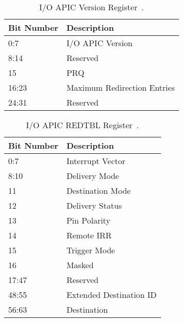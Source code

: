 \begin{table}[H]
  \centering
  \begin{tabularx}{1.0\textwidth}{| X | X |}
    \hline
    \textbf{Bit Number} & \textbf{Description}        \\ \hline\hline
    0:7                 & I/O APIC Version            \\ \hline
    8:14                & Reserved                    \\ \hline
    15                  & PRQ                         \\ \hline
    16:23               & Maximum Redirection Entries \\ \hline
    24:31               & Reserved                    \\ \hline
  \end{tabularx}
  \caption{I/O APIC Version Register~\cite[sec.~9.5.7]{ich5}.}
  \label{tab:ioapicregsver}
\end{table}

\begin{table}[H]
  \centering
  \begin{tabularx}{1.0\textwidth}{| X | X |}
    \hline
    \textbf{Bit Number} & \textbf{Description}    \\ \hline\hline
    0:7                 & Interrupt Vector        \\ \hline
    8:10                & Delivery Mode           \\ \hline
    11                  & Destination Mode        \\ \hline
    12                  & Delivery Status         \\ \hline
    13                  & Pin Polarity            \\ \hline
    14                  & Remote IRR              \\ \hline
    15                  & Trigger Mode            \\ \hline
    16                  & Masked                  \\ \hline
    17:47               & Reserved                \\ \hline
    48:55               & Extended Destination ID \\ \hline
    56:63               & Destination             \\ \hline
  \end{tabularx}
  \caption{I/O APIC REDTBL Register~\cite[sec.~9.5.8]{ich5}.}
  \label{tab:ioapicregsredtbl}
\end{table}

